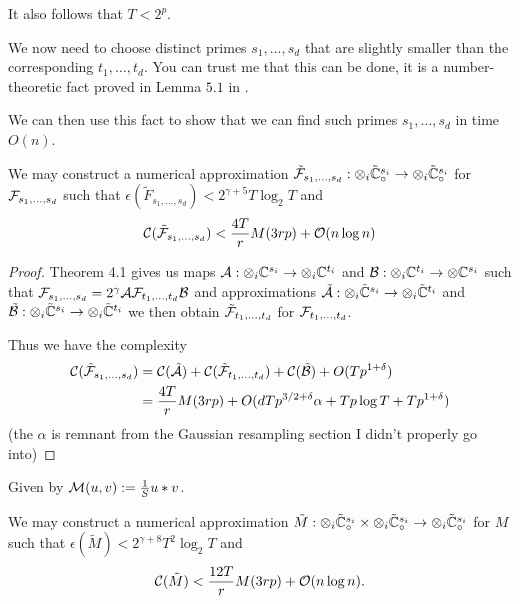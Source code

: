 It also follows that $T < 2^p$.

We now need to choose distinct primes $s_1, \ldots, s_d$ that are slightly smaller than the corresponding $t_1, \ldots, t_d$. You can trust me that this can be done, it is a number-theoretic fact proved in Lemma $5.1$ in \cite{nlogn}.

We can then use this fact to show that we can find such primes $s_1, \ldots, s_d$ in time $O(n)$.

\begin{proposition}
    We may construct a numerical approximation $\tilde{\mathcal F}_{s_1, \ldots, s_d}: \otimes_i \tilde{{\mathbb C}}_\circ^{s_i} \to \otimes_i \tilde{{\mathbb C}}_\circ^{s_i}$ for $\mathcal F_{s_1, \ldots, s_d}$ such that $\epsilon(\tilde{F}_{s_1, \ldots, s_d}) < 2^{\gamma + 5} T \log_2 T$ and
    \[
        \mathcal C(\tilde{\mathcal F}_{s_1, \ldots, s_d}) < \frac{4T}{r} M(3rp) + \mathcal O(n \log n)
    \]
\end{proposition}

\begin{proof}
    Theorem 4.1 gives us maps $\mathcal A: \otimes_i {\mathbb C}^{s_i} \to \otimes_i {\mathbb C}^{t_i}$ and $\mathcal B: \otimes_i {\mathbb C}^{t_i} \to \otimes {\mathbb C}^{s_i}$ such that $\mathcal F_{s_1, \ldots, s_d} = 2^\gamma \mathcal A\mathcal F_{t_1, \ldots, t_d} \mathcal B$ and approximations $\tilde{\mathcal A}: \otimes_i \tilde{{\mathbb C}}^{s_i} \to \otimes_i \tilde{{\mathbb C}}^{t_i}$ and $\tilde{\mathcal B}: \otimes_i \tilde{{\mathbb C}}^{s_i} \to \otimes_i \tilde{{\mathbb C}}^{t_i}$ we then obtain $\tilde{\mathcal F}_{t_1, \ldots, t_d}$ for $\mathcal F_{t_1, \ldots, t_d}$. 

    Thus we have the complexity
    \begin{align*}
        \mathcal C(\tilde{\mathcal F}_{s_1, \ldots, s_d}) &= \mathcal C(\tilde{\mathcal A}) + \mathcal C(\tilde{\mathcal F}_{t_1, \ldots, t_d}) + \mathcal C(\tilde{\mathcal B}) + O(Tp^{1 + \delta})\\
                                                &= \frac{4T}{r}M(3rp) + O(dTp^{3/2 + \delta}\alpha + Tp\log T + Tp^{1 + \delta})
    \end{align*}
    (the $\alpha$ is remnant from the Gaussian resampling section I didn't properly go into)
\end{proof}

Given by $\mathcal M(u, v) := \frac{1}{S}u \ast v$.

\begin{proposition}
    We may construct a numerical approximation $\tilde{M}: \otimes_i \tilde{{\mathbb C}}_\circ^{s_i} \times \otimes_i \tilde{{\mathbb C}}_\circ^{s_i} \to \otimes_i \tilde{{\mathbb C}}_\circ^{s_i}$ for $M$ such that $\epsilon(\tilde{M}) < 2^{\gamma + 8}T^2 \log_2T$ and
    \[
        \mathcal C(\tilde{M}) < \frac{12T}{r} M(3rp) + \mathcal O(n \log n).
    \]
\end{proposition}

